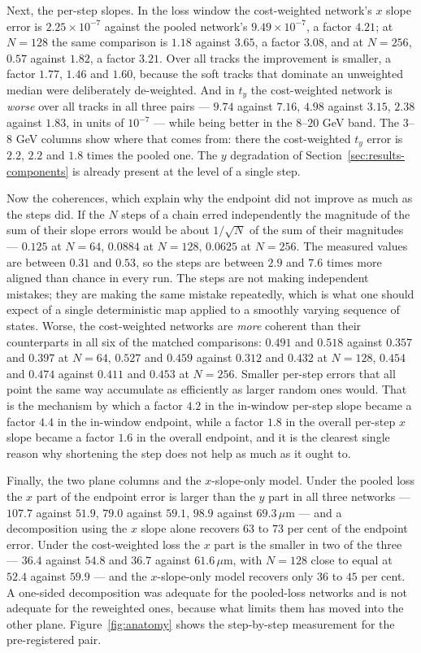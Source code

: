 \documentclass[11pt,a4paper]{article}
\newcommand{\um}{\ensuremath{\,\mu\mathrm{m}}}
\begin{document}
Next, the per-step slopes. In the loss window the cost-weighted network's $x$
slope error is $2.25\times10^{-7}$ against the pooled network's
$9.49\times10^{-7}$, a factor $4.21$; at $N = 128$ the same comparison is
$1.18$ against $3.65$, a factor $3.08$, and at $N = 256$, $0.57$ against $1.82$,
a factor $3.21$. Over all tracks the improvement is smaller, a factor $1.77$,
$1.46$ and $1.60$, because the soft tracks that dominate an unweighted median
were deliberately de-weighted. And in $t_y$ the cost-weighted network is
\emph{worse} over all tracks in all three pairs --- $9.74$ against $7.16$,
$4.98$ against $3.15$, $2.38$ against $1.83$, in units of $10^{-7}$ --- while
being better in the $8$--$20$ GeV band. The $3$--$8$ GeV columns show where that
comes from: there the cost-weighted $t_y$ error is $2.2$, $2.2$ and $1.8$ times
the pooled one. The $y$ degradation of Section~\ref{sec:results-components} is
already present at the level of a single step.

Now the coherences, which explain why the endpoint did not improve as much as
the steps did. If the $N$ steps of a chain erred independently the magnitude of
the sum of their slope errors would be about $1/\sqrt{N}$ of the sum of their
magnitudes --- $0.125$ at $N = 64$, $0.0884$ at $N = 128$, $0.0625$ at
$N = 256$. The measured values are between $0.31$ and $0.53$, so the steps are
between $2.9$ and $7.6$ times more aligned than chance in every run. The steps
are not making independent mistakes; they are making the same mistake
repeatedly, which is what one should expect of a single deterministic map
applied to a smoothly varying sequence of states. Worse, the cost-weighted
networks are \emph{more} coherent than their counterparts in all six of the
matched comparisons: $0.491$ and $0.518$ against $0.357$ and $0.397$ at $N = 64$,
$0.527$ and $0.459$ against $0.312$ and $0.432$ at $N = 128$, $0.454$ and
$0.474$ against $0.411$ and $0.453$ at $N = 256$. Smaller per-step errors that
all point the same way accumulate as efficiently as larger random ones would.
That is the mechanism by which a factor $4.2$ in the in-window per-step slope
became a factor $4.4$ in the in-window endpoint, while a factor $1.8$ in the
overall per-step $x$ slope became a factor $1.6$ in the overall endpoint, and it
is the clearest single reason why shortening the step does not help as much as
it ought to.

Finally, the two plane columns and the $x$-slope-only model. Under the pooled
loss the $x$ part of the endpoint error is larger than the $y$ part in all three
networks --- $107.7$ against $51.9$, $79.0$ against $59.1$, $98.9$ against
$69.3\um$ --- and a decomposition using the $x$ slope alone recovers $63$ to
$73$ per cent of the endpoint error. Under the cost-weighted loss the $x$ part
is the smaller in two of the three --- $36.4$ against $54.8$ and $36.7$ against
$61.6\um$, with $N = 128$ close to equal at $52.4$ against $59.9$ --- and the
$x$-slope-only model recovers only $36$ to $45$ per cent. A one-sided
decomposition was adequate for the pooled-loss networks and is not adequate for
the reweighted ones, because what limits them has moved into the other plane.
Figure~\ref{fig:anatomy} shows the step-by-step measurement for the
pre-registered pair.
\end{document}
